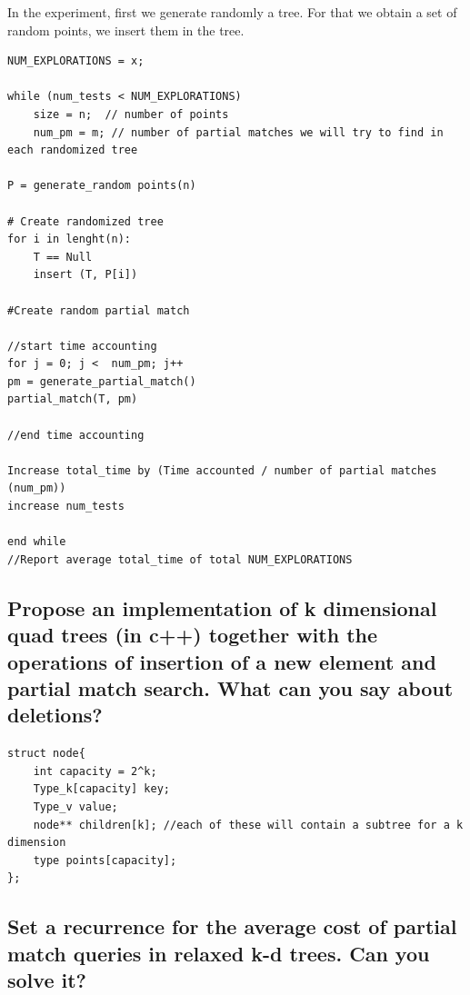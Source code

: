 \documentclass{article}
\begin{document}
In the experiment, first we generate randomly a tree. For that we obtain a set of random points, we insert them in the tree.

\begin{lstlisting}[caption=Pseudo-code on how evaluate the average cost of partial match queris in relaxed kd-trees, style=myC]
NUM_EXPLORATIONS = x;

while (num_tests < NUM_EXPLORATIONS)
    size = n;  // number of points
    num_pm = m; // number of partial matches we will try to find in each randomized tree

P = generate_random points(n)

# Create randomized tree
for i in lenght(n):
    T == Null
    insert (T, P[i])

#Create random partial match

//start time accounting
for j = 0; j <  num_pm; j++
pm = generate_partial_match()
partial_match(T, pm) 

//end time accounting

Increase total_time by (Time accounted / number of partial matches (num_pm))
increase num_tests

end while
//Report average total_time of total NUM_EXPLORATIONS

\end{lstlisting}


\subsection{Propose an implementation of k dimensional quad trees (in c++) together
with the operations of insertion of a new element and partial match search.
What can you say about deletions?}

\begin{lstlisting}[caption=Class Node of k dimensional quad trees, style=myC]
struct node{
    int capacity = 2^k;
    Type_k[capacity] key;
    Type_v value;
    node** children[k]; //each of these will contain a subtree for a k dimension
    type points[capacity];
};
\end{lstlisting}



\subsection{Set a recurrence for the average cost of partial match queries in relaxed
k-d trees. Can you solve it?}
\end{document}
